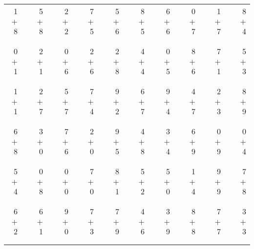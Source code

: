 \documentclass[12pt, letterpaper]{article}
\begin{document}
\begin{tabular}{rrrrrrrrrrrrrrrrrrr}
1 & & 5 & & 2 & & 7 & & 5 & & 8 & & 6 & & 0 & & 1 & & 8\\
$+$ 8 & & $+$ 8 & & $+$ 2 & & $+$ 5 & & $+$ 6 & & $+$ 5 & & $+$ 6 & & $+$ 7 & & $+$ 7 & & $+$ 4\\
\cline{1-1} \cline{3-3} \cline{5-5} \cline{7-7} \cline{9-9} \cline{11-11} \cline{13-13} \cline{15-15} \cline{17-17} \cline{19-19} \\ \\
0 & & 2 & & 0 & & 2 & & 2 & & 4 & & 0 & & 8 & & 7 & & 5\\
$+$ 1 & & $+$ 1 & & $+$ 6 & & $+$ 6 & & $+$ 8 & & $+$ 4 & & $+$ 5 & & $+$ 6 & & $+$ 1 & & $+$ 3\\
\cline{1-1} \cline{3-3} \cline{5-5} \cline{7-7} \cline{9-9} \cline{11-11} \cline{13-13} \cline{15-15} \cline{17-17} \cline{19-19} \\ \\
1 & & 2 & & 5 & & 7 & & 9 & & 6 & & 9 & & 4 & & 2 & & 8\\
$+$ 1 & & $+$ 7 & & $+$ 7 & & $+$ 4 & & $+$ 2 & & $+$ 7 & & $+$ 4 & & $+$ 7 & & $+$ 3 & & $+$ 9\\
\cline{1-1} \cline{3-3} \cline{5-5} \cline{7-7} \cline{9-9} \cline{11-11} \cline{13-13} \cline{15-15} \cline{17-17} \cline{19-19} \\ \\
6 & & 3 & & 7 & & 2 & & 9 & & 4 & & 3 & & 6 & & 0 & & 0\\
$+$ 8 & & $+$ 0 & & $+$ 6 & & $+$ 0 & & $+$ 5 & & $+$ 8 & & $+$ 4 & & $+$ 9 & & $+$ 9 & & $+$ 4\\
\cline{1-1} \cline{3-3} \cline{5-5} \cline{7-7} \cline{9-9} \cline{11-11} \cline{13-13} \cline{15-15} \cline{17-17} \cline{19-19} \\ \\
5 & & 0 & & 0 & & 7 & & 8 & & 5 & & 5 & & 1 & & 9 & & 7\\
$+$ 4 & & $+$ 8 & & $+$ 0 & & $+$ 0 & & $+$ 1 & & $+$ 2 & & $+$ 0 & & $+$ 4 & & $+$ 9 & & $+$ 8\\
\cline{1-1} \cline{3-3} \cline{5-5} \cline{7-7} \cline{9-9} \cline{11-11} \cline{13-13} \cline{15-15} \cline{17-17} \cline{19-19} \\ \\
6 & & 6 & & 9 & & 7 & & 7 & & 4 & & 3 & & 8 & & 7 & & 3\\
$+$ 2 & & $+$ 1 & & $+$ 0 & & $+$ 3 & & $+$ 9 & & $+$ 6 & & $+$ 9 & & $+$ 8 & & $+$ 7 & & $+$ 3\\
\cline{1-1} \cline{3-3} \cline{5-5} \cline{7-7} \cline{9-9} \cline{11-11} \cline{13-13} \cline{15-15} \cline{17-17} \cline{19-19} \\ \\

\end{tabular}
\end{document}
